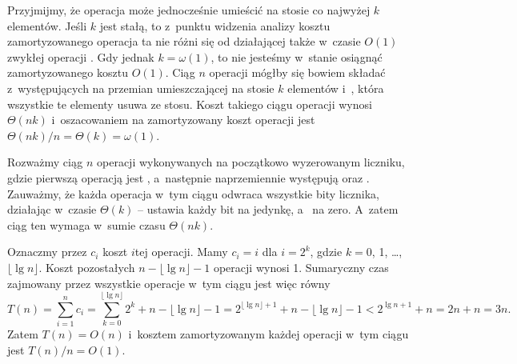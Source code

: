 
\exercise %
Przyjmijmy, że operacja  może jednocześnie umieścić na stosie co najwyżej $k$ elementów.
Jeśli $k$ jest stałą, to z~punktu widzenia analizy kosztu zamortyzowanego operacja ta nie różni się od działającej także w~czasie $O(1)$ zwykłej operacji .
Gdy jednak $k=\omega(1)$, to nie jesteśmy w~stanie osiągnąć zamortyzowanego kosztu $O(1)$.
Ciąg $n$ operacji mógłby się bowiem składać z~występujących na przemian  umieszczającej na stosie $k$ elementów i~, która wszystkie te elementy usuwa ze stosu.
Koszt takiego ciągu operacji wynosi $\Theta(nk)$ i~oszacowaniem na zamortyzowany koszt operacji jest $\Theta(nk)/n=\Theta(k)=\omega(1)$.

\exercise %
Rozważmy ciąg $n$ operacji wykonywanych na początkowo wyzerowanym liczniku, gdzie pierwszą operacją jest , a~następnie naprzemiennie występują  oraz .
Zauważmy, że każda operacja w~tym ciągu odwraca wszystkie bity licznika, działając w~czasie $\Theta(k)$ --  ustawia każdy bit na jedynkę, a~ na zero.
A~zatem ciąg ten wymaga w~sumie czasu $\Theta(nk)$.

\exercise %
Oznaczmy przez $c_i$ koszt $i$\nbhyphen tej operacji.
Mamy $c_i=i$ dla $i=2^k$, gdzie $k=0$, 1, \dots, $\lfloor\lg n\rfloor$.
Koszt pozostałych $n-\lfloor\lg n\rfloor-1$ operacji wynosi 1.
Sumaryczny czas zajmowany przez wszystkie operacje w~tym ciągu jest więc równy
\[
	T(n) = \sum_{i=1}^nc_i = \sum_{k=0}^{\lfloor\lg n\rfloor}2^k+n-\lfloor\lg n\rfloor-1 = 2^{\lfloor\lg n\rfloor+1}+n-\lfloor\lg n\rfloor-1 < 2^{\lg n+1}+n = 2n+n = 3n.
\]
Zatem $T(n)=O(n)$ i~kosztem zamortyzowanym każdej operacji w~tym ciągu jest $T(n)/n=O(1)$.
